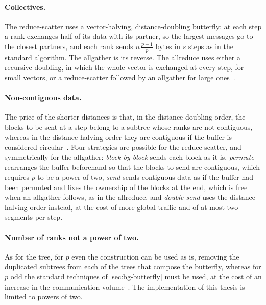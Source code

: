 \paragraph{Collectives.}
The reduce-scatter uses a vector-halving, distance-doubling \bine{} butterfly: at each step a rank exchanges half of its data with its partner, so the largest messages go to the closest partners, and each rank sends $n\,\tfrac{p-1}{p}$ bytes in $s$ steps as in the standard algorithm.
The allgather is its reverse.
The allreduce uses either a \bine{} recursive doubling, in which the whole vector is exchanged at every step, for small vectors, or a reduce-scatter followed by an allgather for large ones~\cite{desensi2025bine}.

\paragraph{Non-contiguous data.}
The price of the shorter distances is that, in the distance-doubling order, the blocks to be sent at a step belong to a subtree whose ranks are not contiguous, whereas in the distance-halving order they are contiguous if the buffer is considered circular~\cite{desensi2025bine}.
Four strategies are possible for the reduce-scatter, and symmetrically for the allgather: \emph{block-by-block} sends each block as it is, \emph{permute} rearranges the buffer beforehand so that the blocks to send are contiguous, which requires $p$ to be a power of two, \emph{send} sends contiguous data as if the buffer had been permuted and fixes the ownership of the blocks at the end, which is free when an allgather follows, as in the allreduce, and \emph{double send} uses the distance-halving order instead, at the cost of more global traffic and of at most two segments per step.

\paragraph{Number of ranks not a power of two.}
As for the \bine{} tree, for $p$ even the construction can be used as is, removing the duplicated subtrees from each of the trees that compose the butterfly, whereas for $p$ odd the standard techniques of \cref{sec:bg-butterfly} must be used, at the cost of an increase in the communication volume~\cite{desensi2025bine}.
The implementation of this thesis is limited to powers of two.

